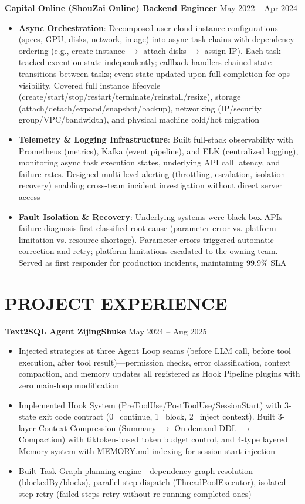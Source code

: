 \documentclass[10pt, a4paper]{article}
\newcommand{\entry}[2]{
  \vspace{0.4em}
  \noindent\textbf{#1} \hfill \small #2
  \vspace{0.15em}\newline
}
\begin{document}
\entry{Capital Online (ShouZai Online) \textbar{} Backend Engineer}{May 2022 -- Apr 2024}
\begin{itemize}
  \item \textbf{Async Orchestration}: Decomposed user cloud instance configurations (specs, GPU, disks, network, image) into async task chains with dependency ordering (e.g., create instance $\to$ attach disks $\to$ assign IP). Each task tracked execution state independently; callback handlers chained state transitions between tasks; event state updated upon full completion for ops visibility. Covered full instance lifecycle (create/start/stop/restart/terminate/reinstall/resize), storage (attach/detach/expand/snapshot/backup), networking (IP/security group/VPC/bandwidth), and physical machine cold/hot migration

  \item \textbf{Telemetry \& Logging Infrastructure}: Built full-stack observability with Prometheus (metrics), Kafka (event pipeline), and ELK (centralized logging), monitoring async task execution states, underlying API call latency, and failure rates. Designed multi-level alerting (throttling, escalation, isolation recovery) enabling cross-team incident investigation without direct server access

  \item \textbf{Fault Isolation \& Recovery}: Underlying systems were black-box APIs---failure diagnosis first classified root cause (parameter error vs. platform limitation vs. resource shortage). Parameter errors triggered automatic correction and retry; platform limitations escalated to the owning team. Served as first responder for production incidents, maintaining 99.9\% SLA
\end{itemize}

\section{PROJECT EXPERIENCE}

\entry{Text2SQL Agent \textbar{} ZijingShuke}{May 2024 -- Aug 2025}
\begin{itemize}
  \item Injected strategies at three Agent Loop seams (before LLM call, before tool execution, after tool result)---permission checks, error classification, context compaction, and memory updates all registered as Hook Pipeline plugins with zero main-loop modification

  \item Implemented Hook System (PreToolUse/PostToolUse/SessionStart) with 3-state exit code contract (0=continue, 1=block, 2=inject context). Built 3-layer Context Compression (Summary $\to$ On-demand DDL $\to$ Compaction) with tiktoken-based token budget control, and 4-type layered Memory system with MEMORY.md indexing for session-start injection

  \item Built Task Graph planning engine---dependency graph resolution (blockedBy/blocks), parallel step dispatch (ThreadPoolExecutor), isolated step retry (failed steps retry without re-running completed ones)
\end{itemize}
\end{document}
